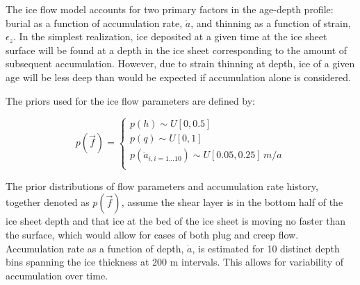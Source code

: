 The ice flow model accounts for two primary factors in the age-depth profile: burial as a function of accumulation rate, $\dot{a}$, and thinning as a function of strain, $\epsilon_z$. In the simplest realization, ice deposited at a given time at the ice sheet surface will be found at a depth in the ice sheet corresponding to the amount of subsequent accumulation. However, due to strain thinning at depth, ice of a given age will be less deep than would be expected if accumulation alone is considered. 


The priors used for the ice flow parameters are defined by:

\begin{center}
\begin{equation}\label{priors}
p(\vec{f}) = 
\begin{cases}
p(h) \sim U[0, 0.5] \\
p(q) \sim U[0, 1] \\
p(\dot{a}_{i, i=1...10}) \sim U[0.05,0.25]\,m/a\\
\end{cases}	
\end{equation}	
\end{center}

The prior distributions of flow parameters and accumulation rate history, together denoted as $p(\vec{f})$, assume the shear layer is in the bottom half of the ice sheet depth \citep{cuffey2010} and that ice at the bed of the ice sheet is moving no faster than the surface, which would allow for cases of both plug and creep flow. Accumulation rate as a function of depth, $\dot{a}$, is estimated for 10 distinct depth bins spanning the ice thickness at 200 m intervals. This allows for variability of accumulation over time. 
